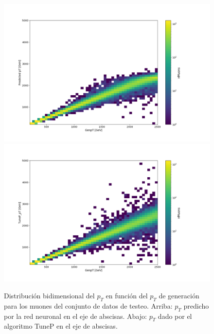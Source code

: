 \begin{figure}[h]
\centering
\includegraphics[width=1.0\textwidth]{figures/data_test_ptpred_genpt.png}
\includegraphics[width=1.0\textwidth]{figures/data_test_tuneppt_genpt.png}

\caption{Distribuci\'on bidimensional del $p_{T}$ en funci\'on del $p_{T}$ de generaci\'on para los muones del conjunto de datos de testeo. Arriba: $p_{T}$ predicho por la red neuronal en el eje de abscisas. Abajo: $p_{T}$ dado por el algoritmo TuneP en el eje de abscisas.}
\label{fig:test_ptpred_tuneppt_genpt}  
\end{figure}

